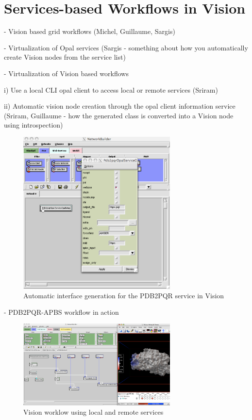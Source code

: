 \documentclass[conference]{IEEEtran}
\begin{document}
\section {Services-based Workflows in Vision}

- Vision based grid workflows (Michel, Guillaume, Sargis)

- Virtualization of Opal services (Sargis - something about how you
automatically create Vision nodes from the service list)

- Virtualization of Vision based workflows

  i) Use a local CLI opal client to access local or remote services (Sriram)

 ii) Automatic vision node creation through the opal client information
 service (Sriram, Guillaume - how the generated class is converted into a Vision node using introspection)

\begin{figure}
\begin{center}
\includegraphics[width=8cm]{vision-gui}
\end{center}
\caption{Automatic interface generation for the PDB2PQR service in Vision}
\label{fig:vision-gui}
\end{figure}

- PDB2PQR-APBS workflow in action

\begin{figure}
\begin{center}
\includegraphics[width=8cm]{vision-workflow}
\end{center}
\caption{Vision worklow using local and remote services}
\label{fig:vision-workflow}
\end{figure}
\end{document}
